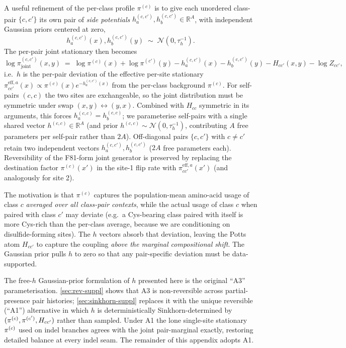 \begin{remark}
\label{rem:side-potentials}
A useful refinement of the per-class profile $\pi^{(c)}$ is to give
each unordered class-pair $\{c, c'\}$ its own pair of \emph{side
potentials}
$h^{(c, c')}_a, h^{(c, c')}_b \in \mathbb{R}^A$, with independent
Gaussian priors centered at zero,
\begin{equation}
h^{(c, c')}_a(x), h^{(c, c')}_b(y) \;\sim\; \mathcal{N}(0, \tau_h^{-1}).
\end{equation}
The per-pair joint stationary then becomes
\begin{equation}
\log \pi^{(c, c')}_{\mathrm{joint}}(x, y) \;=\; \log \pi^{(c)}(x) + \log \pi^{(c')}(y) - h^{(c, c')}_a(x) - h^{(c, c')}_b(y) - H_{cc'}(x, y) - \log Z_{cc'},
\end{equation}
i.e.\ $h$ is the per-pair deviation of the effective per-site
stationary
$\pi^{\mathrm{eff}, a}_{cc'}(x) \propto \pi^{(c)}(x) e^{-h^{(c, c')}_a(x)}$
from the per-class background $\pi^{(c)}$. For self-pairs $(c, c)$
the two sites are exchangeable, so the joint distribution must be
symmetric under swap $(x, y) \leftrightarrow (y, x)$. Combined with
$H_{cc}$ symmetric in its arguments, this forces
$h^{(c,c)}_a = h^{(c,c)}_b$; we parameterise self-pairs with a
single shared vector $h^{(c,c)} \in \mathbb{R}^A$ (and prior
$h^{(c,c)} \sim \mathcal{N}(0, \tau_h^{-1})$, contributing $A$ free
parameters per self-pair rather than $2A$). Off-diagonal pairs
$\{c, c'\}$ with $c \ne c'$ retain two independent vectors
$h^{(c,c')}_a, h^{(c,c')}_b$ ($2A$ free parameters each).
Reversibility of the F81-form joint generator is preserved by
replacing the destination factor $\pi^{(c)}(x')$ in the site-1 flip
rate with $\pi^{\mathrm{eff}, a}_{cc'}(x')$ (and analogously for
site 2).

The motivation is that $\pi^{(c)}$ captures the population-mean
amino-acid usage of class $c$ \emph{averaged over all class-pair
contexts}, while the actual usage of class $c$ when paired with
class $c'$ may deviate (e.g.\ a Cys-bearing class paired with itself
is more Cys-rich than the per-class average, because we are
conditioning on disulfide-forming sites). The $h$ vectors absorb
that deviation, leaving the Potts atom $H_{cc'}$ to capture the
coupling \emph{above the marginal compositional shift}. The Gaussian
prior pulls $h$ to zero so that any pair-specific deviation must be
data-supported.

The free-$h$ Gaussian-prior formulation of $h$ presented here is
the original ``A3'' parameterisation. \autoref{sec:rev-suppl} shows
that A3 is non-reversible across partial-presence pair histories;
\autoref{sec:sinkhorn-suppl} replaces it with the unique reversible
(``A1'') alternative in which $h$ is deterministically
Sinkhorn-determined by $(\pi^{(c)},\pi^{(c')},H_{cc'})$ rather than
sampled. Under A1 the lone single-site stationary $\pi^{(c)}$ used
on indel branches agrees with the joint pair-marginal exactly,
restoring detailed balance at every indel seam. The remainder of
this appendix adopts A1.
\end{remark}

